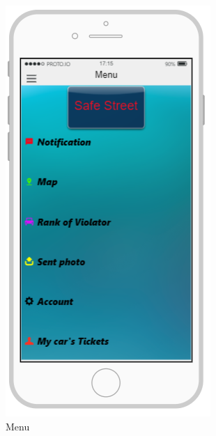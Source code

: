 \documentclass{article}
\begin{document}
\begin{figure}[H]
\begin{subfigure}[H]{0.25\linewidth}
					\includegraphics[width=\linewidth]{Images/Menu.png}
					\caption{Menu}
				\end{subfigure}
				\begin{subfigure}[H]{0.25\linewidth}

\end{subfigure}
\end{figure}
\end{document}
